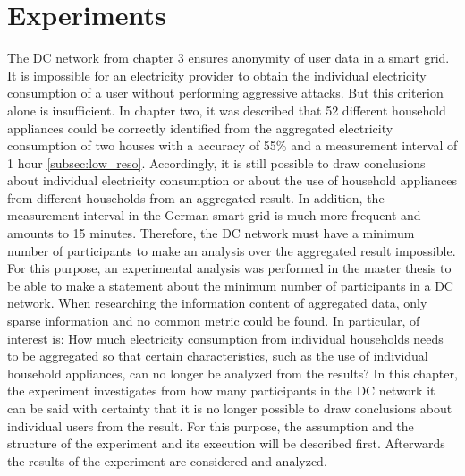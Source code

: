 \chapter{Experiments}
\label{sec:experiments}


The DC network from chapter 3 ensures anonymity of user data in a smart grid. It is impossible for an electricity provider to obtain the individual electricity consumption of a user without performing aggressive attacks. But this criterion alone is insufficient. In chapter two, it was described that 52 different household appliances could be correctly identified from the aggregated electricity consumption of two houses with a accuracy of 55\% and a measurement interval of 1 hour \ref{subsec:low_reso}. Accordingly, it is still possible to draw conclusions about individual electricity consumption or about the use of household appliances from different households from an aggregated result. In addition, the measurement interval in the German smart grid is much more frequent and amounts to 15 minutes. Therefore, the DC network must have a minimum number of participants to make an analysis over the aggregated result impossible. For this purpose, an experimental analysis was performed in the master thesis to be able to make a statement about the minimum number of participants in a DC network. When researching the information content of aggregated data, only sparse information and no common metric could be found. In particular, of interest is: How much electricity consumption from individual households needs to be aggregated so that certain characteristics, such as the use of individual household appliances, can no longer be analyzed from the results? In this chapter, the experiment investigates from how many participants in the DC network it can be said with certainty that it is no longer possible to draw conclusions about individual users from the result. For this purpose, the assumption and the structure of the experiment and its execution will be described first. Afterwards the results of the experiment are considered and analyzed.
